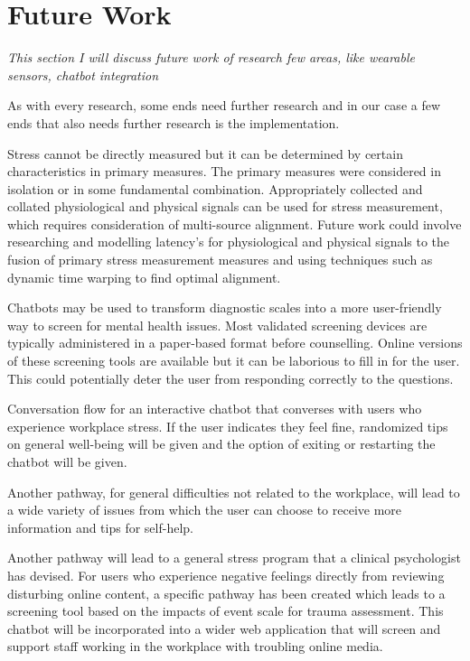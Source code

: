 \chapter{Future Work}
\textit{This section I will discuss future work of research few areas, like wearable sensors, chatbot integration}
\vspace{5mm}

As with every research, some ends need further research and in our case a few ends that also
needs further research is the implementation.

Stress cannot be directly measured but it can be determined by certain characteristics in primary measures. The primary measures were considered in isolation or in some fundamental combination. Appropriately collected and collated physiological and physical signals can be used for stress measurement, which requires consideration of multi-source alignment. Future work could involve researching and modelling latency's for physiological and physical signals to the fusion of primary stress measurement measures and using techniques such as dynamic time warping to find optimal alignment.

Chatbots may be used to transform diagnostic scales into a more user-friendly way to screen for mental health issues. Most validated screening devices are typically administered in a paper-based format before counselling. Online versions of these screening tools are available but it can be laborious to fill in for the user. This could potentially deter the user from responding correctly to the questions.

Conversation flow for an interactive chatbot that converses with users who experience workplace stress. If the user indicates they feel fine, randomized tips on general well-being will be given and the option of exiting or restarting the chatbot will be given. 

Another pathway, for general difficulties not related to the workplace, will lead to a wide variety of issues from which the user can choose to receive more information and tips for self-help.

Another pathway will lead to a general stress program that a clinical psychologist has devised. For users who experience negative feelings directly from reviewing disturbing online content, a specific pathway has been created which leads to a screening tool based on the impacts of event scale for trauma assessment. This chatbot will be incorporated into a wider web application that will screen and support staff working in the workplace with troubling online media.